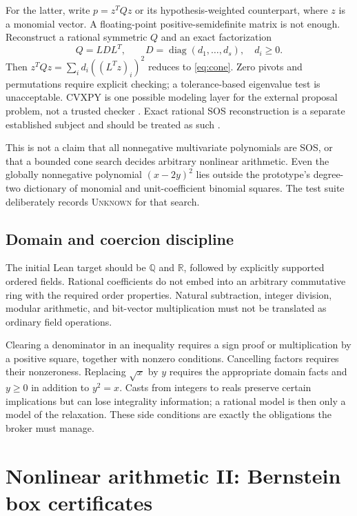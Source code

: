 \documentclass[11pt,a4paper]{article}
\newcommand{\Q}{\mathbb Q}\newcommand{\R}{\mathbb R}\newcommand{\N}{\mathbb N}
\newcommand{\unknown}{\textsc{Unknown}}
\begin{document}
For the latter, write $p=z^TQz$ or its hypothesis-weighted counterpart, where $z$ is a monomial vector. A floating-point positive-semidefinite matrix is not enough. Reconstruct a rational symmetric $Q$ and an exact factorization
\[
 Q=L D L^T,\qquad D=\operatorname{diag}(d_1,\ldots,d_s),\quad d_i\ge0.
\]
Then $z^TQz=\sum_i d_i((L^Tz)_i)^2$ reduces to \eqref{eq:cone}. Zero pivots and permutations require explicit checking; a tolerance-based eigenvalue test is unacceptable. CVXPY is one possible modeling layer for the external proposal problem, not a trusted checker \cite{cvxpy}. Exact rational SOS reconstruction is a separate established subject and should be treated as such \cite{rationalsos}.

This is not a claim that all nonnegative multivariate polynomials are SOS, or that a bounded cone search decides arbitrary nonlinear arithmetic. Even the globally nonnegative polynomial $(x-2y)^2$ lies outside the prototype's degree-two dictionary of monomial and unit-coefficient binomial squares. The test suite deliberately records \unknown{} for that search.

\subsection{Domain and coercion discipline}
The initial Lean target should be $\Q$ and $\R$, followed by explicitly supported ordered fields. Rational coefficients do not embed into an arbitrary commutative ring with the required order properties. Natural subtraction, integer division, modular arithmetic, and bit-vector multiplication must not be translated as ordinary field operations.

Clearing a denominator in an inequality requires a sign proof or multiplication by a positive square, together with nonzero conditions. Cancelling factors requires their nonzeroness. Replacing $\sqrt{x}$ by $y$ requires the appropriate domain facts and $y\ge0$ in addition to $y^2=x$. Casts from integers to reals preserve certain implications but can lose integrality information; a rational model is then only a model of the relaxation. These side conditions are exactly the obligations the broker must manage.

\section{Nonlinear arithmetic II: Bernstein box certificates}
\end{document}
